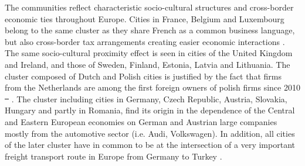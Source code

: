 \documentclass[10pt,letterpaper]{article}
\providecommand{\DIFadd}[1]{{\protect\color{blue}\uwave{#1}}} %
\providecommand{\DIFdel}[1]{{\protect\color{red}\sout{#1}}}                      %
\providecommand{\DIFaddbegin}{} %
\providecommand{\DIFaddend}{} %
\providecommand{\DIFdelbegin}{} %
\providecommand{\DIFdelend}{} %
\begin{document}
The communities reflect characteristic socio-cultural structures and cross-border economic ties throughout Europe. Cities in France, Belgium and Luxembourg belong to the same cluster as they share French as a common business language, but also cross-border tax arrangements creating easier economic interactions \cite{DecovilleDurand2019}. The same socio-cultural proximity effect is seen in cities of the United Kingdom and Ireland, and those of Sweden, Finland, Estonia, Latvia and Lithuania. The cluster composed of Dutch and Polish cities is justified by the fact that firms from the Netherlands are among the first foreign owners of polish firms since 2010 \DIFdelbegin \DIFdel{\mbox{%
\cite{2019arXiv191014652Z}}\hspace{0pt}%
}\DIFdelend \DIFaddbegin \DIFadd{\mbox{%
\cite{2020Zdanowska}}\hspace{0pt}%
}\DIFaddend . The cluster including cities in Germany, Czech Republic, Austria, Slovakia, Hungary and partly in Romania, find its origin in the dependence of the Central and Eastern European economies on German and Austrian large companies mostly from the automotive sector (i.e. Audi, Volkswagen). In addition, all cities of the later cluster have in common to be at the intersection of a very important freight transport route in Europe from Germany to Turkey \cite{Zdanowska2017}. 
\DIFaddbegin 
\end{document}
